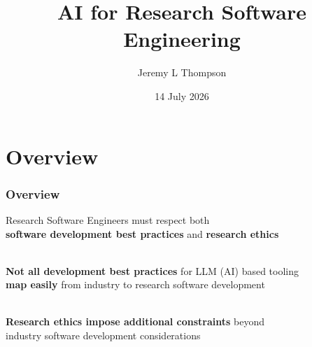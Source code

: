 \documentclass{beamer}
\title[AI for RSEng]{AI for Research Software Engineering
} %
\author{Jeremy L Thompson} %
\institute[Helmholtz Hereon] %
{Helmholtz-Zentrum Hereon \\ %
\medskip
\textit{jeremy@jeremylt.org} %
}
\date{14 July 2026} %
\begin{document}
\begin{frame}
\titlepage %
\end{frame}

\section{Overview}

\begin{frame}
\begin{center}
\frametitle{Overview}

Research Software Engineers must respect both\\\textbf{software development best practices} and \textbf{research ethics}

~\\

\textbf{Not all development best practices} for LLM (AI) based tooling\\\textbf{map easily} from industry to research software development

~\\

\textbf{Research ethics impose additional constraints} beyond\\industry software development considerations

~\\


\end{center}
\end{frame}

\end{document}
